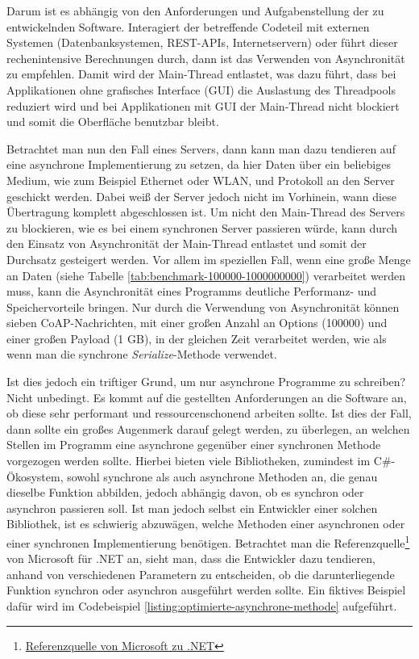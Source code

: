 Darum ist es abhängig von den Anforderungen und Aufgabenstellung der zu entwickelnden Software. Interagiert der betreffende Codeteil mit externen Systemen (Datenbanksystemen, REST-APIs, Internetservern) oder führt dieser rechenintensive Berechnungen durch, dann ist das Verwenden von Asynchronität zu empfehlen. Damit wird der Main-Thread entlastet, was dazu führt, dass bei Applikationen ohne grafisches Interface (GUI) die Auslastung des Threadpools reduziert wird und bei Applikationen mit GUI der Main-Thread nicht blockiert und somit die Oberfläche benutzbar bleibt.

Betrachtet man nun den Fall eines Servers, dann kann man dazu tendieren auf eine asynchrone Implementierung zu setzen, da hier Daten über ein beliebiges Medium, wie zum Beispiel Ethernet oder WLAN, und Protokoll an den Server geschickt werden. Dabei weiß der Server jedoch nicht im Vorhinein, wann diese Übertragung komplett abgeschlossen ist. Um nicht den Main-Thread des Servers zu blockieren, wie es bei einem synchronen Server passieren würde, kann durch den Einsatz von Asynchronität der Main-Thread entlastet und somit der Durchsatz gesteigert werden. Vor allem im speziellen Fall, wenn eine große Menge an Daten (siehe Tabelle \ref{tab:benchmark-100000-1000000000}) verarbeitet werden muss, kann die Asynchronität eines Programms deutliche Performanz- und Speichervorteile bringen. Nur durch die Verwendung von Asynchronität können sieben CoAP-Nachrichten, mit einer großen Anzahl an Options (100000) und einer großen Payload (1 GB), in der gleichen Zeit verarbeitet werden, wie als wenn man die synchrone \textit{Serialize}-Methode verwendet.

Ist dies jedoch ein triftiger Grund, um nur asynchrone Programme zu schreiben? Nicht unbedingt. Es kommt auf die gestellten Anforderungen an die Software an, ob diese sehr performant und ressourcenschonend arbeiten sollte. Ist dies der Fall, dann sollte ein großes Augenmerk darauf gelegt werden, zu überlegen, an welchen Stellen im Programm eine asynchrone gegenüber einer synchronen Methode vorgezogen werden sollte. Hierbei bieten viele Bibliotheken, zumindest im C\#-Ökosystem, sowohl synchrone als auch asynchrone Methoden an, die genau dieselbe Funktion abbilden, jedoch abhängig davon, ob es synchron oder asynchron passieren soll. Ist man jedoch selbst ein Entwickler einer solchen Bibliothek, ist es schwierig abzuwägen, welche Methoden einer asynchronen oder einer synchronen Implementierung benötigen. Betrachtet man die Referenzquelle\footnote{\href{https://github.com/microsoft/referencesource}{Referenzquelle von Microsoft zu .NET}} von Microsoft für .NET an, sieht man, dass die Entwickler dazu tendieren, anhand von verschiedenen Parametern zu entscheiden, ob die darunterliegende Funktion synchron oder asynchron ausgeführt werden sollte. Ein fiktives Beispiel dafür wird im Codebeispiel \ref{listing:optimierte-asynchrone-methode} aufgeführt.

